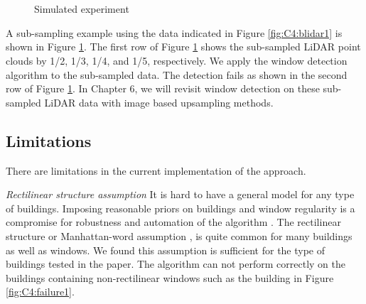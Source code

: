 \begin{figure}[H]
\centering
{} 
\hspace{.1in}
\hspace{.1in}
\hspace{.1in}
 \\

\hspace{.1in}
\hspace{.1in}
\hspace{.1in}
 \\

\caption{Simulated experiment} 
\label{fig:C4:Simulated_Experiments}
\end{figure} 

A sub-sampling example using the data indicated in
Figure \ref{fig:C4:blidar1} is shown in Figure \ref{fig:C4:Simulated_Experiments}. The first row of Figure \ref{fig:C4:Simulated_Experiments} shows the sub-sampled LiDAR point clouds by 1/2, 1/3, 1/4, and 1/5, respectively. We apply the window detection algorithm to the sub-sampled data. The detection fails as shown in the second row of Figure \ref{fig:C4:Simulated_Experiments}. In Chapter 6, we will revisit window detection on these sub-sampled LiDAR data with image based upsampling methods.

\subsection{Limitations}  

There are limitations in the current implementation of the approach. 

{\it Rectilinear structure assumption} It is hard to have a general model for any type of buildings. Imposing reasonable priors on buildings and window regularity is a compromise for robustness and automation of the algorithm \cite{Xiao09}. The rectilinear structure  or Manhattan-word assumption \cite{Coughlan99}, is quite common for many buildings as well as windows. We found this assumption is sufficient for the type of buildings tested in the paper. The algorithm can not perform correctly on the buildings containing non-rectilinear windows such as the building in Figure \ref{fig:C4:failure1}. 


